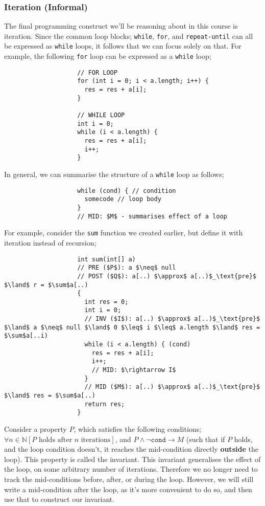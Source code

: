\documentclass[a4paper, 12pt]{article}
\begin{document}
            \subsubsection*{Iteration (Informal)}
                The final programming construct we'll be reasoning about in this course is iteration. Since the common loop blocks; \texttt{while}, \texttt{for}, and \texttt{repeat-until} can all be expressed as \texttt{while} loops, it follows that we can focus solely on that. For example, the following \texttt{for} loop can be expressed as a \texttt{while} loop;
                \begin{lstlisting}
                    // FOR LOOP
                    for (int i = 0; i < a.length; i++) {
                      res = res + a[i];
                    }

                    // WHILE LOOP
                    int i = 0;
                    while (i < a.length) {
                      res = res + a[i];
                      i++;
                    }
                \end{lstlisting}
                In general, we can summarise the structure of a \texttt{while} loop as follows;
                \begin{lstlisting}
                    while (cond) { // condition
                      somecode // loop body
                    }
                    // MID: $M$ - summarises effect of a loop
                \end{lstlisting}
                For example, consider the \texttt{sum} function we created earlier, but define it with iteration instead of recursion;
                \begin{lstlisting}
                    int sum(int[] a)
                    // PRE ($P$): a $\neq$ null
                    // POST ($Q$): a[..) $\approx$ a[..)$_\text{pre}$ $\land$ r = $\sum$a[..)
                    {
                      int res = 0;
                      int i = 0;
                      // INV ($I$): a[..) $\approx$ a[..)$_\text{pre}$ $\land$ a $\neq$ null $\land$ 0 $\leq$ i $\leq$ a.length $\land$ res = $\sum$a[..i)
                      while (i < a.length) { (cond)
                        res = res + a[i];
                        i++;
                        // MID: $\rightarrow I$
                      }
                      // MID ($M$): a[..) $\approx$ a[..)$_\text{pre}$ $\land$ res = $\sum$a[..)
                      return res;
                    }
                \end{lstlisting}
                Consider a property $P$, which satisfies the following conditions; $\forall n \in \mathbb{N} [P \text{ holds after } n \text{ iterations}]$, and $P \land \neg\texttt{cond} \rightarrow M$ (such that if $P$ holds, and the loop condition doesn't, it reaches the mid-condition directly \textbf{outside} the loop). This property is called the invariant. This invariant generalises the effect of the loop, on some arbitrary number of iterations. Therefore we no longer need to track the mid-conditions before, after, or during the loop. However, we will still write a mid-condition after the loop, as it's more convenient to do so, and then use that to construct our invariant.
                \medskip
\end{document}
